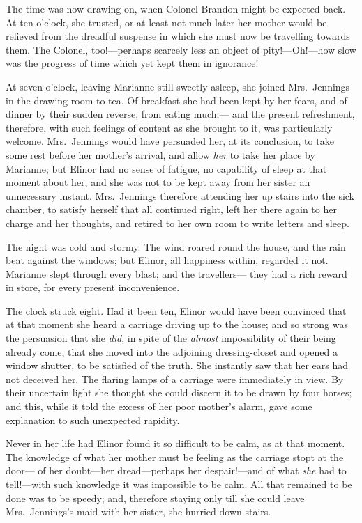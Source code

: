 The time was now drawing on, when Colonel Brandon
might be expected back.  At ten o'clock, she trusted,
or at least not much later her mother would be relieved
from the dreadful suspense in which she must now be
travelling towards them.  The Colonel, too!---perhaps scarcely
less an object of pity!---Oh!---how slow was the progress
of time which yet kept them in ignorance!

At seven o'clock, leaving Marianne still sweetly asleep,
she joined Mrs.\ Jennings in the drawing-room to tea.
Of breakfast she had been kept by her fears, and of
dinner by their sudden reverse, from eating much;---%
and the present refreshment, therefore, with such feelings
of content as she brought to it, was particularly welcome.
Mrs.\ Jennings would have persuaded her, at its conclusion,
to take some rest before her mother's arrival, and allow \emph{her} to
take her place by Marianne; but Elinor had no sense of fatigue,
no capability of sleep at that moment about her, and she was
not to be kept away from her sister an unnecessary instant.
Mrs.\ Jennings therefore attending her up stairs into the
sick chamber, to satisfy herself that all continued right,
left her there again to her charge and her thoughts,
and retired to her own room to write letters and sleep.

The night was cold and stormy.  The wind roared
round the house, and the rain beat against the windows;
but Elinor, all happiness within, regarded it not.
Marianne slept through every blast; and the travellers---%
they had a rich reward in store, for every present inconvenience.

The clock struck eight.  Had it been ten,
Elinor would have been convinced that at that moment
she heard a carriage driving up to the house;
and so strong was the persuasion that she \emph{did}, in spite
of the \emph{almost} impossibility of their being already come,
that she moved into the adjoining dressing-closet and
opened a window shutter, to be satisfied of the truth.
She instantly saw that her ears had not deceived her.
The flaring lamps of a carriage were immediately in view.
By their uncertain light she thought she could discern it
to be drawn by four horses; and this, while it told the
excess of her poor mother's alarm, gave some explanation
to such unexpected rapidity.

Never in her life had Elinor found it so difficult
to be calm, as at that moment.  The knowledge of what her
mother must be feeling as the carriage stopt at the door---%
of her doubt---her dread---perhaps her despair!---and
of what \emph{she} had to tell!---with such knowledge it was
impossible to be calm.  All that remained to be done
was to be speedy; and, therefore staying only till
she could leave Mrs.\ Jennings's maid with her sister,
she hurried down stairs.

